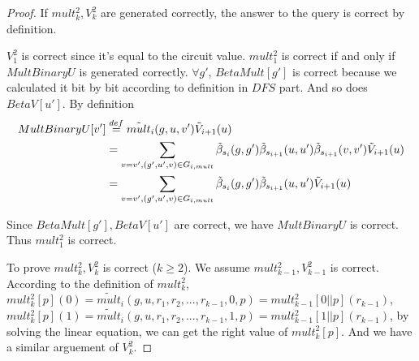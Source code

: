 {\begin{proof}
		If $mult_k^2, V_k^2$ are generated correctly, the answer to the query is correct by definition.
		
		$V_1^2$ is correct since it's equal to the circuit value. $mult_1^2$ is correct if and only if $MultBinaryU$ is generated correctly. $\forall g'$, $BetaMult[g']$ is correct because we calculated it bit by bit according to definition in $DFS$ part. And so does $BetaV[u']$. By definition 
		\begin{align*}
		MultBinaryU[v']&\overset{def}{=}\tilde{mult}_{i}(g, u, v')\tilde{V}_{i+1}(u)
		\\&=\sum_{v=v', (g', u', v) \in G_{i, mult}}\tilde{\beta}_{s_{i}}(g, g')\tilde{\beta}_{s_{i+1}}(u, u')\tilde{\beta}_{s_{i+1}}(v, v')\tilde{V}_{i+1}(u)
		\\&=\sum_{v=v', (g', u', v) \in G_{i, mult}}\tilde{\beta}_{s_{i}}(g, g')\tilde{\beta}_{s_{i+1}}(u, u')\tilde{V}_{i+1}(u)
		\end{align*}
		
		Since $BetaMult[g'], BetaV[u']$ are correct, we have $MultBinaryU$ is correct. Thus $mult_1^2$ is correct.
		
		To prove $mult_k^2, V_k^2$ is correct ($k \ge 2$). We assume $mult_{k-1}^2, V_{k-1}^2$ is correct. According to the definition of $mult_k^2$, $mult_k^2[p](0)=\tilde{mult}_i(g, u, {r_1, r_2,...,r_{k-1}, 0, p})=mult_{k-1}^2[0||p](r_{k-1})$, $mult_k^2[p](1)=\tilde{mult}_i(g, u, {r_1, r_2,...,r_{k-1}, 1, p})=mult_{k-1}^2[1||p](r_{k-1})$, by solving the linear equation, we can get the right value of $mult_k^2[p]$. And we have a similar arguement of $V_k^2$.
	\end{proof}
}